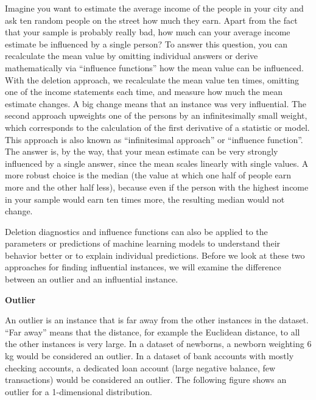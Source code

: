 \documentclass[
  10pt,
]{scrbook}
\begin{document}
Imagine you want to estimate the average income of the people in your city and ask ten random people on the street how much they earn.
Apart from the fact that your sample is probably really bad, how much can your average income estimate be influenced by a single person?
To answer this question, you can recalculate the mean value by omitting individual answers or derive mathematically via ``influence functions'' how the mean value can be influenced.
With the deletion approach, we recalculate the mean value ten times, omitting one of the income statements each time, and measure how much the mean estimate changes.
A big change means that an instance was very influential.
The second approach upweights one of the persons by an infinitesimally small weight, which corresponds to the calculation of the first derivative of a statistic or model.
This approach is also known as ``infinitesimal approach'' or ``influence function''.
The answer is, by the way, that your mean estimate can be very strongly influenced by a single answer, since the mean scales linearly with single values.
A more robust choice is the median (the value at which one half of people earn more and the other half less), because even if the person with the highest income in your sample would earn ten times more, the resulting median would not change.

Deletion diagnostics and influence functions can also be applied to the parameters or predictions of machine learning models to understand their behavior better or to explain individual predictions.
Before we look at these two approaches for finding influential instances, we will examine the difference between an outlier and an influential instance.

\textbf{Outlier}

An outlier is an instance that is far away from the other instances in the dataset.
``Far away'' means that the distance, for example the Euclidean distance, to all the other instances is very large.
In a dataset of newborns, a newborn weighting 6 kg would be considered an outlier.
In a dataset of bank accounts with mostly checking accounts, a dedicated loan account (large negative balance, few transactions) would be considered an outlier.
The following figure shows an outlier for a 1-dimensional distribution.
\end{document}
